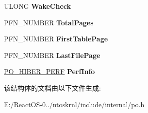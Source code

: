 \begin{DoxyCompactItemize}
\mbox{\label{struct___p_o___m_e_m_o_r_y___i_m_a_g_e_ad01925a7f17ff5b9f5aaa2c265c52f7d}} 
U\+L\+O\+NG {\bfseries Wake\+Check}
\item 
\mbox{\label{struct___p_o___m_e_m_o_r_y___i_m_a_g_e_a9391d8481a381d131b311b76e5f62197}} 
P\+F\+N\+\_\+\+N\+U\+M\+B\+ER {\bfseries Total\+Pages}
\item 
\mbox{\label{struct___p_o___m_e_m_o_r_y___i_m_a_g_e_a1c95ee98fc6852abd35d52efb3d1392e}} 
P\+F\+N\+\_\+\+N\+U\+M\+B\+ER {\bfseries First\+Table\+Page}
\item 
\mbox{\label{struct___p_o___m_e_m_o_r_y___i_m_a_g_e_a5e435d5063f26b2b21901aa195a58b1e}} 
P\+F\+N\+\_\+\+N\+U\+M\+B\+ER {\bfseries Last\+File\+Page}
\item 
\mbox{\label{struct___p_o___m_e_m_o_r_y___i_m_a_g_e_a4c3f4ab5b25d5423fe937ab84194317f}} 
\hyperlink{struct___p_o___h_i_b_e_r___p_e_r_f}{P\+O\+\_\+\+H\+I\+B\+E\+R\+\_\+\+P\+E\+RF} {\bfseries Perf\+Info}
\end{DoxyCompactItemize}


该结构体的文档由以下文件生成\+:\begin{DoxyCompactItemize}
\item 
E\+:/\+React\+O\+S-\/0../ntoskrnl/include/internal/po.\+h\end{DoxyCompactItemize}
